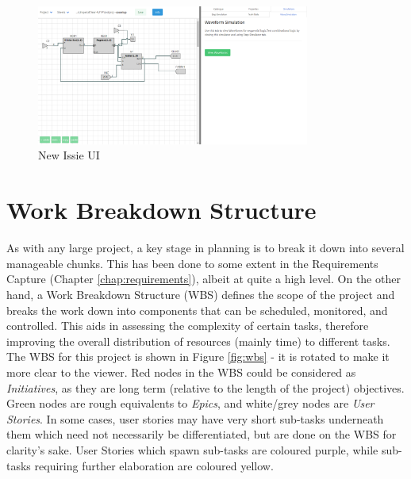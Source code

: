 \begin{figure}
    \centering
    \includegraphics[width=0.8\textwidth]{04.ImpPlan/NewUI.png}
    \caption{New Issie UI}
    \label{fig:NewUI}
\end{figure}

\section{Work Breakdown Structure}
As with any large project, a key stage in planning is to break it down into several manageable chunks. This has been done to some extent in the Requirements Capture (Chapter \ref{chap:requirements}), albeit at quite a high level. On the other hand, a Work Breakdown Structure (WBS) \cite{projectmanagement} defines the scope of the project and breaks the work down into components that can be scheduled, monitored, and controlled. This aids in assessing the complexity of certain tasks, therefore improving the overall distribution of resources (mainly time) to different tasks. The WBS for this project is shown in Figure \ref{fig:wbs} - it is rotated to make it more clear to the viewer. Red nodes in the WBS could be considered as \emph{Initiatives}, as they are long term (relative to the length of the project) objectives. Green nodes are rough equivalents to \emph{Epics}, and white/grey nodes are \emph{User Stories}. In some cases, user stories may have very short sub-tasks underneath them which need not necessarily be differentiated, but are done on the WBS for clarity's sake. User Stories which spawn sub-tasks are coloured purple, while sub-tasks requiring further elaboration are coloured yellow. 

